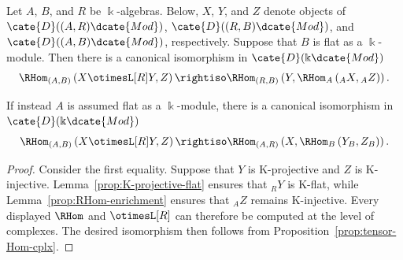 \begin{theorem}\label{prop:RHom-otimesL-adjunction}
	Let $A$, $B$, and $R$ be $\Bbbk$-algebras. Below, $X$, $Y$, and $Z$ denote
	objects of $\cate{D}((A,R)\dcate{Mod})$,
	$\cate{D}((R,B)\dcate{Mod})$, and
	$\cate{D}((A,B)\dcate{Mod})$, respectively. Suppose that $B$ is flat as a
	$\Bbbk$-module. Then there is a canonical isomorphism in
	$\cate{D}(\Bbbk\dcate{Mod})$
	\begin{equation*}
		\RHom_{(A,B)} \left( X \otimesL[R] Y, Z \right) \rightiso \RHom_{(R,B)}\left( Y, \RHom_A \left( {}_A X, {}_A Z \right) \right).
	\end{equation*}

	If instead $A$ is assumed flat as a $\Bbbk$-module, there is a canonical
	isomorphism in $\cate{D}(\Bbbk\dcate{Mod})$
	\begin{equation*}
		\RHom_{(A,B)}\left( X \otimesL[R] Y, Z \right) \rightiso \RHom_{(A,R)}\left( X, \RHom_B\left( Y_B , Z_B \right) \right).
	\end{equation*}
\end{theorem}
\begin{proof}
	Consider the first equality. Suppose that $Y$ is K-projective and $Z$ is
	K-injective. Lemma~\ref{prop:K-projective-flat} ensures that ${}_R Y$ is
	K-flat, while Lemma~\ref{prop:RHom-enrichment} ensures that ${}_A Z$
	remains K-injective. Every displayed $\RHom$ and $\otimesL[R]$ can therefore
	be computed at the level of complexes. The desired isomorphism then follows
	from Proposition~\ref{prop:tensor-Hom-cplx}.
\end{proof}

